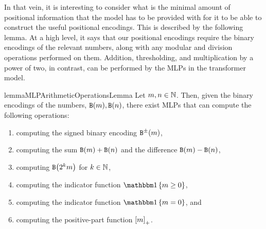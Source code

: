 In that vein, it is interesting to consider what is the minimal amount of positional information that the model has to be provided with for it to be able to construct the useful positional encodings.
This is described by the following lemma.
At a high level, it says that our positional encodings require the binary encodings of the relevant numbers, along with any modular and division operations performed on them.
Addition, thresholding, and multiplication by a power of two, in contrast, can be performed by the MLPs in the transformer model.
\begin{restatable}{lemma}{MLPArithmeticOperationsLemma} \label{lem:mlp-arithmetic-operations}
   Let $m, n \in {{\mathbb{N}}}$. 
   Then, given the binary encodings of the numbers, $\binFun{m}, \binFun{n}$, there exist MLPs that can compute the following operations:
   \begin{enumerate}[label=\textit{(\alph*)}]
      \item computing the signed binary encoding $\sbinFun{m}$,
      \item computing the sum $\binFun{m} + \binFun{n}$ and the difference $\binFun{m} - \binFun{n}$,
      \item computing $\binFun{2^k m}$ for $k \in {{\mathbb{N}}}$,
      \item computing the indicator function $\ind{m \geq 0}$,
      \item computing the indicator function $\ind{m = 0}$, and
      \item computing the positive-part function ${\left[ m \right]_{+}}$.
   \end{enumerate}
\end{restatable}
